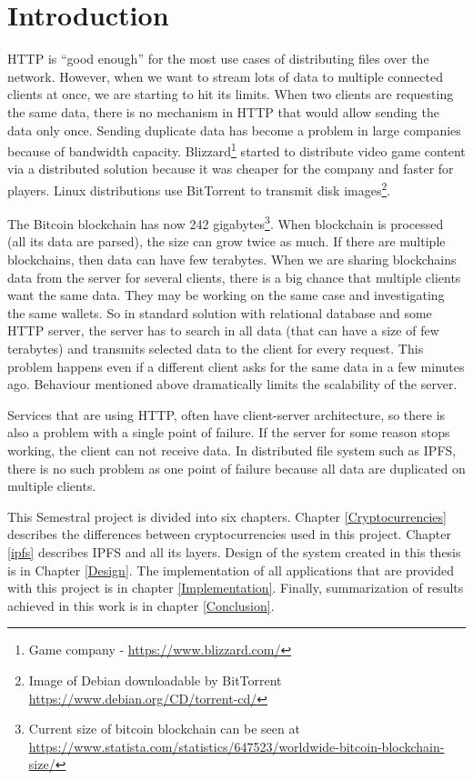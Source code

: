 \chapter{Introduction}


HTTP is ``good enough'' for the most use cases of distributing files over the network. However, when we want to stream lots of data to multiple connected clients at once, we are starting to hit its limits. When two clients are requesting the same data, there is no mechanism in HTTP that would allow sending the data only once. Sending duplicate data has become a problem in large companies because of bandwidth capacity. Blizzard\footnote{Game company - \url{https://www.blizzard.com/}} started to distribute video game content via a distributed solution because it was cheaper for the company and faster for players\cite{BigDataInVideoGames}. Linux distributions use BitTorrent to transmit disk images\footnote{Image of Debian downloadable by BitTorrent \url{https://www.debian.org/CD/torrent-cd/}}.

The Bitcoin blockchain has now 242 gigabytes\footnote{Current size of bitcoin blockchain can be seen at \url{https://www.statista.com/statistics/647523/worldwide-bitcoin-blockchain-size/}}. When blockchain is processed (all its data are parsed), the size can grow twice as much. If there are multiple blockchains, then data can have few terabytes. When we are sharing blockchains data from the server for several clients, there is a big chance that multiple clients want the same data. They may be working on the same case and investigating the same wallets. So in standard solution with relational database and some HTTP server, the server has to search in all data (that can have a size of few terabytes) and transmits selected data to the client for every request. This problem happens even if a different client asks for the same data in a few minutes ago. Behaviour mentioned above dramatically limits the scalability of the server.

Services that are using HTTP, often have client-server architecture, so there is also a problem with a single point of failure. If the server for some reason stops working, the client can not receive data. In distributed file system such as IPFS, there is no such problem as one point of failure because all data are duplicated on multiple clients.

This Semestral project is divided into six chapters. Chapter \ref{Cryptocurrencies} describes the differences between cryptocurrencies used in this project. Chapter \ref{ipfs} describes IPFS and all its layers. Design of the system created in this thesis is in Chapter \ref{Design}. The implementation of all applications that are provided with this project is in chapter \ref{Implementation}. Finally, summarization of results achieved in this work is in chapter \ref{Conclusion}.